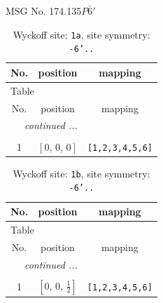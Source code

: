 \documentclass[fleqn,8pt]{jsarticle}
\begin{document}
\setcounter{MaxMatrixCols}{32}

\renewcommand{\tablename}{Table~}
\renewcommand{\figurename}{Figure~}
\begin{center}
\LARGE
MSG No. 174.135\quad$P\bar{6}'$
\end{center}
\renewcommand{\arraystretch}{1.2}
\begin{longtable}{ccc}
\caption{Wyckoff site: {\tt 1a}, site symmetry: {\tt -6'..}}
 \\
 \hline \hline
No. & position & mapping \\ \hline \endfirsthead

\multicolumn{2}{l}{\tablename\ \thetable{}} \\
 \hline \hline
No. & position & mapping \\ \hline \endhead

 \hline \hline
\multicolumn{2}{r}{\footnotesize\it continued ...} \\ \endfoot

 \hline \hline
\multicolumn{2}{r}{} \\ \endlastfoot

1 & $\left[ 0,\, 0,\, 0 \right]$ & {\tt [1,2,3,4,5,6]} \\
\end{longtable}
\renewcommand{\arraystretch}{1.2}
\begin{longtable}{ccc}
\caption{Wyckoff site: {\tt 1b}, site symmetry: {\tt -6'..}}
 \\
 \hline \hline
No. & position & mapping \\ \hline \endfirsthead

\multicolumn{2}{l}{\tablename\ \thetable{}} \\
 \hline \hline
No. & position & mapping \\ \hline \endhead

 \hline \hline
\multicolumn{2}{r}{\footnotesize\it continued ...} \\ \endfoot

 \hline \hline
\multicolumn{2}{r}{} \\ \endlastfoot

1 & $\left[ 0,\, 0,\, \frac{1}{2} \right]$ & {\tt [1,2,3,4,5,6]} \\
\end{longtable}
\renewcommand{\arraystretch}{1.2}
\end{document}
